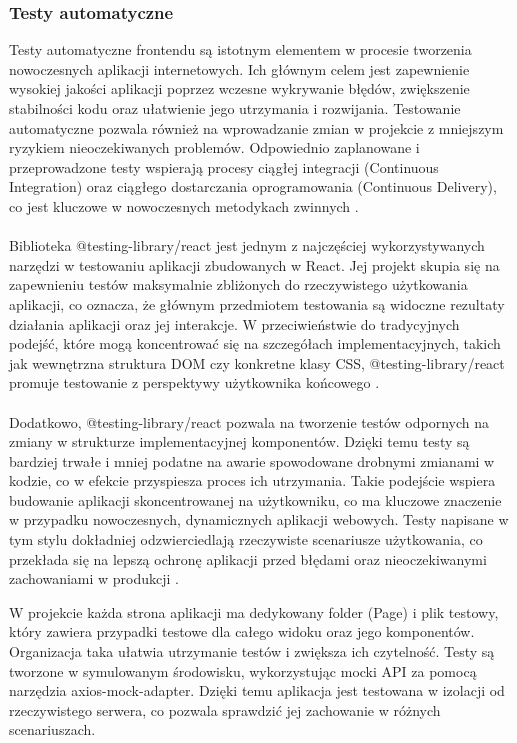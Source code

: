 \documentclass[twoside]{projektInzynierskiMS1}
\begin{document}
\subsubsection{Testy automatyczne}

\noindent
Testy automatyczne frontendu są istotnym elementem w procesie tworzenia nowoczesnych aplikacji internetowych. Ich głównym celem jest zapewnienie wysokiej jakości aplikacji poprzez wczesne wykrywanie błędów, zwiększenie stabilności kodu oraz ułatwienie jego utrzymania i rozwijania. Testowanie automatyczne pozwala również na wprowadzanie zmian w projekcie z mniejszym ryzykiem nieoczekiwanych problemów. Odpowiednio zaplanowane i przeprowadzone testy wspierają procesy ciągłej integracji (Continuous Integration) oraz ciągłego dostarczania oprogramowania (Continuous Delivery), co jest kluczowe w nowoczesnych metodykach zwinnych \cite{FrontTests}.
\\\\
Biblioteka @testing-library/react jest jednym z najczęściej wykorzystywanych narzędzi w testowaniu aplikacji zbudowanych w React. Jej projekt skupia się na zapewnieniu testów maksymalnie zbliżonych do rzeczywistego użytkowania aplikacji, co oznacza, że głównym przedmiotem testowania są widoczne rezultaty działania aplikacji oraz jej interakcje. W przeciwieństwie do tradycyjnych podejść, które mogą koncentrować się na szczegółach implementacyjnych, takich jak wewnętrzna struktura DOM czy konkretne klasy CSS, @testing-library/react promuje testowanie z perspektywy użytkownika końcowego \cite{ReactTestingLibrary}.
\\\\
Dodatkowo, @testing-library/react pozwala na tworzenie testów odpornych na zmiany w strukturze implementacyjnej komponentów. Dzięki temu testy są bardziej trwałe i mniej podatne na awarie spowodowane drobnymi zmianami w kodzie, co w efekcie przyspiesza proces ich utrzymania. Takie podejście wspiera budowanie aplikacji skoncentrowanej na użytkowniku, co ma kluczowe znaczenie w przypadku nowoczesnych, dynamicznych aplikacji webowych. Testy napisane w tym stylu dokładniej odzwierciedlają rzeczywiste scenariusze użytkowania, co przekłada się na lepszą ochronę aplikacji przed błędami oraz nieoczekiwanymi zachowaniami w produkcji \cite{ReactTestingLibrary}.

\newpage

\noindent
W projekcie każda strona aplikacji ma dedykowany folder (Page) i plik testowy, który zawiera przypadki testowe dla całego widoku oraz jego komponentów. Organizacja taka ułatwia utrzymanie testów i zwiększa ich czytelność. Testy są tworzone w symulowanym środowisku, wykorzystując mocki API za pomocą narzędzia axios-mock-adapter. Dzięki temu aplikacja jest testowana w izolacji od rzeczywistego serwera, co pozwala sprawdzić jej zachowanie w różnych scenariuszach.
\end{document}
